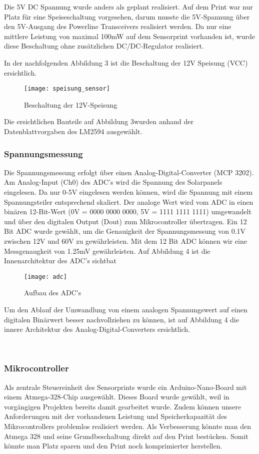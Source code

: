 Die 5V DC Spannung wurde anders als geplant realisiert. Auf dem Print war nur Platz für eine Speiseschaltung vorgesehen, darum musste die 5V-Spannung über den 5V-Ausgang des Powerline Transceivers realisiert werden. Da nur eine mittlere Leistung von maximal 100mW auf dem Sensorprint vorhanden ist, wurde diese Beschaltung ohne zusätzlichen DC/DC-Regulator realisiert.

In der nachfolgenden Abbildung 3 ist die Beschaltung der 12V Speisung (VCC) ersichtlich.


\begin{figure}[h]
\centering
\texttt{[image: speisung\_sensor]}
\caption{Beschaltung der 12V-Speisung}
\end{figure}

Die ersichtlichen Bauteile auf Abbildung 3wurden anhand der Datenblattvorgaben des LM2594 \cite{DCDC_Regulator_LM2594} ausgewählt.

\clearpage
\subsubsection{Spannungsmessung}
Die Spannungsmessung erfolgt über einen Analog-Digital-Converter (MCP 3202). Am Analog-Input (Ch0) des ADC's wird die Spannung des Solarpanels eingelesen. Da nur 0-5V eingelesen werden können, wird die Spannung mit einem Spannungsteiler entsprechend skaliert. Der analoge Wert wird vom ADC in einen binären 12-Bit-Wert (0V = 0000 0000 0000, 5V = 1111 1111 1111) umgewandelt und über den digitalen Output (Dout) zum Mikrocontroller übertragen. Ein 12 Bit ADC wurde gewählt, um die Genauigkeit der Spannungsmessung von 0.1V zwischen 12V und 60V zu gewährleisten. Mit dem 12 Bit ADC können wir eine Messgenaugkeit von 1.25mV gewährleisten. Auf Abbildung 4 ist die Innenarchitektur des ADC's sichtbat

\begin{figure}[h]
\centering
\texttt{[image: adc]}
\caption{Aufbau des ADC's \cite{Datasheet_adc}}
\end{figure}

Um den Ablauf der Umwandlung von einem analogen Spannungswert auf einen digitalen Binärwert besser nachvollziehen zu können, ist auf Abbildung 4 die innere Architektur des Analog-Digital-Converters ersichtlich.

\
\

\subsubsection{Mikrocontroller}
Als zentrale Steuereinheit des Sensorprints wurde ein Arduino-Nano-Board mit einem Atmega-328-Chip ausgewählt. Dieses Board wurde gewählt, weil in vorgängigen Projekten bereits damit gearbeitet wurde. Zudem können unsere Anforderungen mit der vorhandenen Leistung und Speicherkapazität des Mikrocontrollers problemlos realisiert werden. Als Verbesserung könnte man den Atmega 328 und seine Grundbeschaltung direkt auf den Print bestücken. Somit könnte man Platz sparen und den Print noch komprimierter herstellen.

